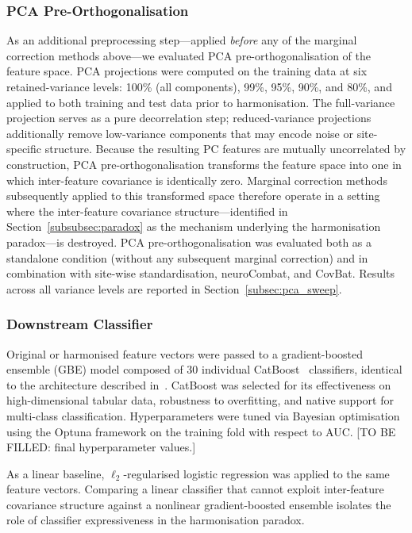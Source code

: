 \documentclass[preprint,12pt]{elsarticle}
\begin{document}
\subsubsection{PCA Pre-Orthogonalisation}
\label{subsubsec:pca}

As an additional preprocessing step---applied \emph{before} any of
the marginal correction methods above---we evaluated PCA
pre-orthogonalisation of the feature space.
PCA projections were computed on the training data at six
retained-variance levels: 100\% (all components), 99\%, 95\%, 90\%,
and 80\%, and applied to both training and test data prior to
harmonisation.
The full-variance projection serves as a pure decorrelation step;
reduced-variance projections additionally remove low-variance
components that may encode noise or site-specific structure.
Because the resulting PC features are mutually uncorrelated by
construction, PCA pre-orthogonalisation transforms the feature space
into one in which inter-feature covariance is identically zero.
Marginal correction methods subsequently applied to this transformed
space therefore operate in a setting where the inter-feature
covariance structure---identified in Section~\ref{subsubsec:paradox}
as the mechanism underlying the harmonisation paradox---is
destroyed.
PCA pre-orthogonalisation was evaluated both as a standalone
condition (without any subsequent marginal correction) and in
combination with site-wise standardisation, neuroCombat, and CovBat.
Results across all variance levels are reported in
Section~\ref{subsec:pca_sweep}.

\subsubsection{Downstream Classifier}
\label{subsubsec:classifier}

Original or harmonised feature vectors were passed to a
gradient-boosted ensemble (GBE) model composed of 30 individual
CatBoost~\cite{prokhorenkova2018catboost} classifiers, identical to
the architecture described in~\cite{poziomska2026quantity}.
CatBoost was selected for its effectiveness on high-dimensional
tabular data, robustness to overfitting, and native support for
multi-class classification.
Hyperparameters were tuned via Bayesian optimisation using the
Optuna framework on the training fold with respect to AUC.
[TO BE FILLED: final hyperparameter values.]

As a linear baseline, $\ell_2$-regularised logistic regression was
applied to the same feature vectors.
Comparing a linear classifier that cannot exploit inter-feature
covariance structure against a nonlinear gradient-boosted ensemble
isolates the role of classifier expressiveness in the harmonisation
paradox.
\end{document}
